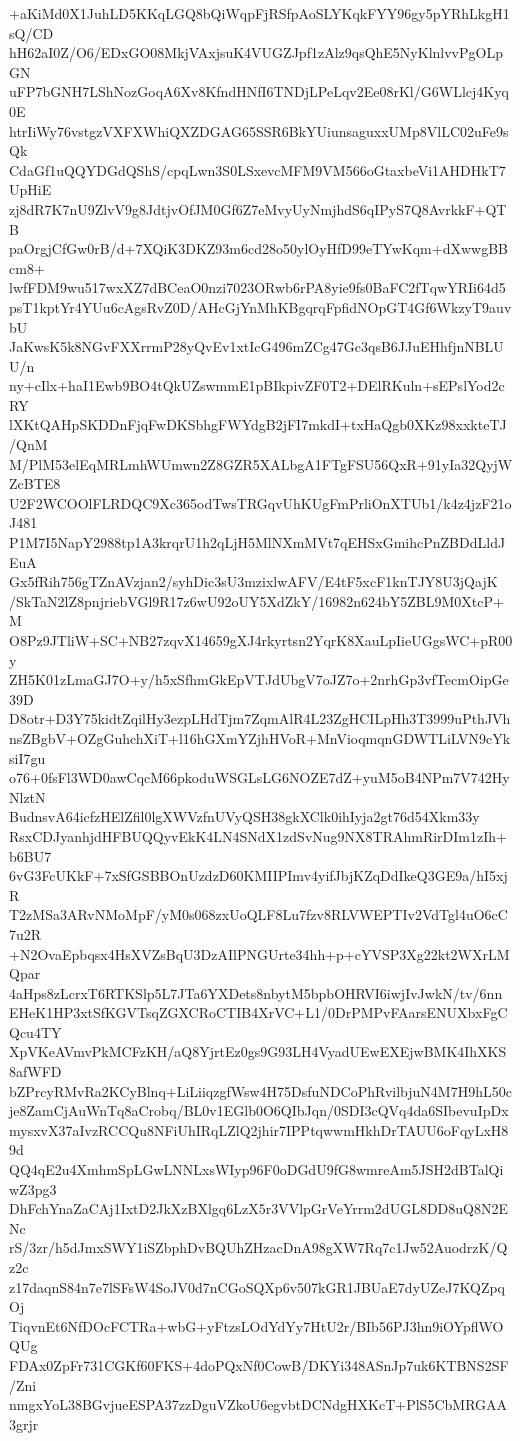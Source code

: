 +aKiMd0X1JuhLD5KKqLGQ8bQiWqpFjRSfpAoSLYKqkFYY96gy5pYRhLkgH1sQ/CD
hH62aI0Z/O6/EDxGO08MkjVAxjsuK4VUGZJpf1zAlz9qsQhE5NyKlnlvvPgOLpGN
uFP7bGNH7LShNozGoqA6Xv8KfndHNfI6TNDjLPeLqv2Ee08rKl/G6WLlcj4Kyq0E
htrIiWy76vstgzVXFXWhiQXZDGAG65SSR6BkYUiunsaguxxUMp8VlLC02uFe9sQk
CdaGf1uQQYDGdQShS/cpqLwn3S0LSxevcMFM9VM566oGtaxbeVi1AHDHkT7UpHiE
zj8dR7K7nU9ZlvV9g8JdtjvOfJM0Gf6Z7eMvyUyNmjhdS6qIPyS7Q8AvrkkF+QTB
paOrgjCfGw0rB/d+7XQiK3DKZ93m6cd28o50ylOyHfD99eTYwKqm+dXwwgBBcm8+
lwfFDM9wu517wxXZ7dBCeaO0nzi7023ORwb6rPA8yie9fs0BaFC2fTqwYRIi64d5
psT1kptYr4YUu6cAgsRvZ0D/AHcGjYnMhKBgqrqFpfidNOpGT4Gf6WkzyT9auvbU
JaKwsK5k8NGvFXXrrmP28yQvEv1xtIcG496mZCg47Gc3qsB6JJuEHhfjnNBLUU/n
ny+cIlx+haI1Ewb9BO4tQkUZswmmE1pBIkpivZF0T2+DElRKuln+sEPslYod2cRY
lXKtQAHpSKDDnFjqFwDKSbhgFWYdgB2jFI7mkdI+txHaQgb0XKz98xxkteTJ/QnM
M/PlM53elEqMRLmhWUmwn2Z8GZR5XALbgA1FTgFSU56QxR+91yIa32QyjWZcBTE8
U2F2WCOOlFLRDQC9Xc365odTwsTRGqvUhKUgFmPrliOnXTUb1/k4z4jzF21oJ481
P1M7I5NapY2988tp1A3krqrU1h2qLjH5MlNXmMVt7qEHSxGmihcPnZBDdLldJEuA
Gx5fRih756gTZnAVzjan2/syhDic3sU3mzixlwAFV/E4tF5xcF1knTJY8U3jQajK
/SkTaN2lZ8pnjriebVGl9R17z6wU92oUY5XdZkY/16982n624bY5ZBL9M0XtcP+M
O8Pz9JTliW+SC+NB27zqvX14659gXJ4rkyrtsn2YqrK8XauLpIieUGgsWC+pR00y
ZH5K01zLmaGJ7O+y/h5xSfhmGkEpVTJdUbgV7oJZ7o+2nrhGp3vfTecmOipGe39D
D8otr+D3Y75kidtZqilHy3ezpLHdTjm7ZqmAlR4L23ZgHCILpHh3T3999uPthJVh
nsZBgbV+OZgGuhchXiT+l16hGXmYZjhHVoR+MnVioqmqnGDWTLiLVN9cYksiI7gu
o76+0fsFl3WD0awCqcM66pkoduWSGLsLG6NOZE7dZ+yuM5oB4NPm7V742HyNlztN
BudnsvA64icfzHElZfil0lgXWVzfnUVyQSH38gkXClk0ihIyja2gt76d54Xkm33y
RsxCDJyanhjdHFBUQQyvEkK4LN4SNdX1zdSvNug9NX8TRAhmRirDIm1zIh+b6BU7
6vG3FcUKkF+7xSfGSBBOnUzdzD60KMIIPImv4yifJbjKZqDdIkeQ3GE9a/hI5xjR
T2zMSa3ARvNMoMpF/yM0s068zxUoQLF8Lu7fzv8RLVWEPTIv2VdTgl4uO6cC7u2R
+N2OvaEpbqsx4HsXVZsBqU3DzAIlPNGUrte34hh+p+cYVSP3Xg22kt2WXrLMQpar
4aHps8zLcrxT6RTKSlp5L7JTa6YXDets8nbytM5bpbOHRVI6iwjIvJwkN/tv/6nn
EHeK1HP3xtSfKGVTsqZGXCRoCTIB4XrVC+L1/0DrPMPvFAarsENUXbxFgCQcu4TY
XpVKeAVmvPkMCFzKH/aQ8YjrtEz0gs9G93LH4VyadUEwEXEjwBMK4IhXKS8afWFD
bZPrcyRMvRa2KCyBlnq+LiLiiqzgfWsw4H75DsfuNDCoPhRvilbjuN4M7H9hL50c
je8ZamCjAuWnTq8aCrobq/BL0v1EGlb0O6QIbJqn/0SDI3cQVq4da6SIbevuIpDx
mysxvX37aIvzRCCQu8NFiUhIRqLZlQ2jhir7IPPtqwwmHkhDrTAUU6oFqyLxH89d
QQ4qE2u4XmhmSpLGwLNNLxsWIyp96F0oDGdU9fG8wmreAm5JSH2dBTalQiwZ3pg3
DhFchYnaZaCAj1IxtD2JkXzBXlgq6LzX5r3VVlpGrVeYrrm2dUGL8DD8uQ8N2ENc
rS/3zr/h5dJmxSWY1iSZbphDvBQUhZHzacDnA98gXW7Rq7c1Jw52AuodrzK/Qz2c
z17daqnS84n7e7lSFsW4SoJV0d7nCGoSQXp6v507kGR1JBUaE7dyUZeJ7KQZpqOj
TiqvnEt6NfDOcFCTRa+wbG+yFtzsLOdYdYy7HtU2r/BIb56PJ3hn9iOYpflWOQUg
FDAx0ZpFr731CGKf60FKS+4doPQxNf0CowB/DKYi348ASnJp7uk6KTBNS2SF/Zni
nmgxYoL38BGvjueESPA37zzDguVZkoU6egvbtDCNdgHXKcT+PlS5CbMRGAA3grjr
